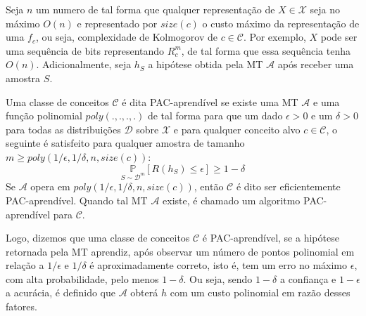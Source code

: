 

Seja $n$ um numero de tal forma que qualquer
representação de $X \in \mathcal{X}$ seja no máximo $O(n)$ e representado por
$size(c)$ o custo máximo da representação de uma $f_c$, ou seja, complexidade de
Kolmogorov de $c \in \mathcal{C}$. Por exemplo, $X$ pode ser uma sequência de bits
representando $R_c^m$, de tal forma que essa sequência tenha $O(n)$. Adicionalmente,
seja $h_S$ a hipótese obtida pela MT $\mathcal{A}$ após receber uma amostra $S$.

Uma classe de conceitos $\mathcal{C}$ é dita PAC-aprendível se existe uma MT $\mathcal{A}$
e uma função polinomial $poly(.,.,.,.)$ de tal forma para que um dado $\epsilon > 0$ e
um $\delta > 0$ para todas as distribuições $\mathcal{D}$ sobre $\mathcal{X}$ e para
qualquer conceito alvo $c \in \mathcal{C}$, o seguinte é satisfeito para qualquer amostra
de tamanho $m \geq poly(1/\epsilon, 1/\delta, n, size(c))$: 
\begin{equation}
\underset{S\sim\mathcal{D}^m}{\mathbb{P}}[R(h_S)\leq\epsilon]\geq 1-\delta
\end{equation}
Se $\mathcal{A}$ opera em $poly(1/\epsilon, 1/\delta, n, size(c))$, então $\mathcal{C}$
é dito ser eficientemente PAC-aprendível. Quando tal MT $\mathcal{A}$ existe, é chamado um
algoritmo PAC-aprendível para $\mathcal{C}$.

Logo, dizemos que uma classe de conceitos $\mathcal{C}$ é PAC-aprendível, se a hipótese
retornada pela MT aprendiz, após observar um número de pontos polinomial em relação a
$1/\epsilon$ e $1/\delta$ é aproximadamente correto, isto é, tem um erro no máximo
$\epsilon$, com alta probabilidade, pelo menos $1-\delta$. Ou seja, sendo $1-\delta$ a
confiança e $1-\epsilon$ a acurácia, é definido que $\mathcal{A}$ obterá $h$ com um
custo polinomial em razão desses fatores.

